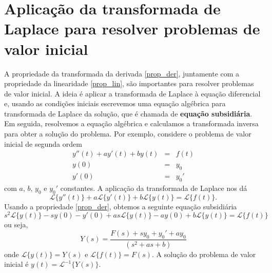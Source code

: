 \section{Aplicação da transformada de Laplace para resolver problemas de valor inicial}
A propriedade da transformada da derivada \ref{prop_der}, juntamente com a propriedade da linearidade \ref{prop_lin}, são importantes para resolver problemas de valor inicial. A ideia é aplicar a transformada de Laplace à equação diferencial e, usando as condições iniciais escrevemos uma equação algébrica para transformada de Laplace da solução, que é chamada de {\bf equação subsidiária}. Em seguida, resolvemos a equação algébrica e calculamos a transformada inversa para obter a solução do problema. Por exemplo, considere o problema de valor inicial de segunda ordem
\begin{eqnarray*}
 y''(t)+ay'(t)+by(t)&=&f(t)\\
y(0)&=&y_0\\
y'(0)&=&y_0'
\end{eqnarray*}
com $a$, $b$, $y_0$ e $y_0'$ constantes. A aplicação da transformada de Laplace nos dá
$$
 \mathcal{L}\{y''(t)\}+a \mathcal{L}\{y'(t)\}+b \mathcal{L}\{y(t)\}= \mathcal{L}\{f(t)\}.
$$
Usando a propriedade \ref{prop_der}, obtemos a seguinte equação subsidiária
$$
 s^2\mathcal{L}\{y(t)\}-sy(0)-y'(0)+a s\mathcal{L}\{y(t)\}-ay(0)+b \mathcal{L}\{y(t)\}= \mathcal{L}\{f(t)\}
$$
ou seja,
$$
 Y(s)=\frac{F(s)+sy_0+y_0'+ay_0}{(s^2+as+b)}
$$
onde $\mathcal{L}\{y(t)\}=Y(s)$ e $\mathcal{L}\{f(t)\}=F(s)$. A solução do problema de valor inicial é  $y(t)=\mathcal{L}^{-1}\{Y(s)\}$.

